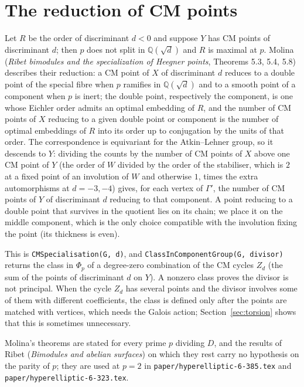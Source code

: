 \documentclass[11pt,reqno]{amsart}
\theoremstyle{plain}
\theoremstyle{definition}
\newcommand{\Q}{\mathbb{Q}}
\begin{document}
\section{The reduction of CM points}\label{sec:cm}

Let $R$ be the order of discriminant $d<0$ and suppose $Y$ has CM points of discriminant $d$; then $p$ does not
split in $\Q(\sqrt d)$ and $R$ is maximal at $p$. Molina (\emph{Ribet bimodules and the specialization of
Heegner points}, Theorems 5.3, 5.4, 5.8) describes their reduction: a CM point of $X$ of discriminant $d$ reduces
to a double point of the special fibre when $p$ ramifies in $\Q(\sqrt d)$ and to a smooth point of a component
when $p$ is inert; the double point, respectively the component, is one whose Eichler order admits an optimal
embedding of $R$, and the number of CM points of $X$ reducing to a given double point or component is the number
of optimal embeddings of $R$ into its order up to conjugation by the units of that order. The correspondence
is equivariant for the Atkin--Lehner group, so it descends to $Y$: dividing the counts by the number of CM points
of $X$ above one CM point of $Y$ (the order of $W$ divided by the order of the stabiliser, which is $2$ at a fixed
point of an involution of $W$ and otherwise $1$, times the extra automorphisms at $d=-3,-4$) gives, for each
vertex of $\Gamma'$, the number of CM points of $Y$ of discriminant $d$ reducing to that component. A point
reducing to a double point that survives in the quotient lies on its chain; we place it on the middle
component, which is the only choice compatible with the involution fixing the point (its thickness is even).

This is \texttt{CMSpecialisation(G, d)}, and \texttt{ClassInComponentGroup(G, divisor)} returns the class in
$\Phi_p$ of a degree-zero combination of the CM cycles $Z_d$ (the sum of the points of discriminant $d$ on $Y$).
A nonzero class proves the divisor is not principal. When the cycle $Z_d$ has several points and the divisor
involves some of them with different coefficients, the class is defined only after the points are matched with
vertices, which needs the Galois action; Section~\ref{sec:torsion} shows that this is sometimes unnecessary.

Molina's theorems are stated for every prime $p$ dividing $D$, and the results of Ribet (\emph{Bimodules and
abelian surfaces}) on which they rest carry no hypothesis on the parity of $p$; they are used at $p=2$ in
\texttt{paper/hyperelliptic-6-385.tex} and \texttt{paper/hyperelliptic-6-323.tex}.
\end{document}
